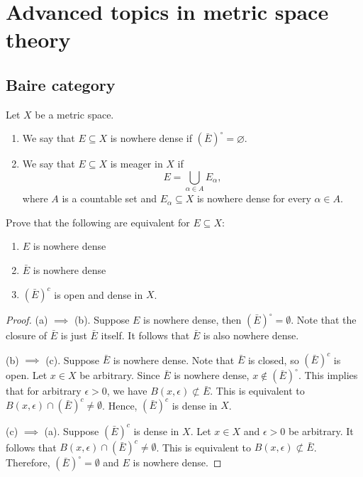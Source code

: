 \documentclass[a4paper]{article}
\begin{document}
\maketitle

\tableofcontents

\section{Advanced topics in metric space theory}

\subsection{Baire category}

\begin{defi}
Let $X$ be a metric space.  
\begin{enumerate}
 \item We say that $E \subseteq X$ is nowhere dense if $(\bar{E})^\circ = \varnothing$.
 \item We say that $E \subseteq X$ is meager in $X$ if 
\begin{equation*}
 E = \bigcup_{\alpha \in A} E_\alpha,
\end{equation*}
where $A$ is a countable set and $E_\alpha \subseteq X$ is nowhere dense for every $\alpha \in A$.
\end{enumerate}
\end{defi}

\begin{thm}
Prove that the following are equivalent for  $E \subseteq X$:
\begin{enumerate}
 \item $E$ is nowhere dense
 \item $\bar{E}$ is nowhere dense
 \item $(\bar{E})^c$ is open and dense in $X$.
\end{enumerate}
\end{thm}

\begin{proof}
  (a) $\implies$ (b). Suppose $E$ is nowhere dense, then 
  $(\bar{E})^\circ = \emptyset$. Note that the closure 
  of $\bar{E}$ is just $\bar{E}$ itself. It follows that 
  $\bar{E}$ is also nowhere dense. 
  
  (b) $\implies$ (c). Suppose $\bar{E}$ is nowhere dense.
  Note that $\bar{E}$ is closed, so $(\bar{E})^c$ is open.
  Let $x \in X$ be arbitrary. Since $\bar{E}$ is nowhere dense,
  $x \notin (\bar{E})^\circ$. This implies that for arbitrary 
  $\epsilon > 0$, we have $B(x, \epsilon) \nsubset \bar{E}$.
  This is equivalent to $B(x, \epsilon) \cap (\bar{E})^c \neq 
  \emptyset$. Hence, $(\bar{E})^c$ is dense in $X$. 

  (c) $\implies$ (a). Suppose $(\bar{E})^c$ is dense in $X$. 
  Let $x \in X$ and $\epsilon > 0$ be arbitrary. It follows 
  that $B(x, \epsilon) \cap (\bar{E})^c \neq \emptyset$. 
  This is equivalent to $B(x, \epsilon) \nsubset \bar{E}$. 
  Therefore, $(\bar{E})^\circ = \emptyset$ and $E$ is nowhere 
  dense.
\end{proof}
\end{document}
